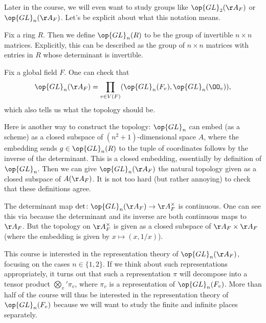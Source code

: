 \documentclass[../notes.tex]{subfiles}
\begin{document}
Later in the course, we will even want to study groups like $\op{GL}_2(\AA_F)$ or $\op{GL}_n(\AA_F)$. Let's be explicit about what this notation means.
\begin{definition}
	Fix a ring $R$. Then we define $\op{GL}_n(R)$ to be the group of invertible $n\times n$ matrices. Explicitly, this can be described as the group of $n\times n$ matrices with entries in $R$ whose determinant is invertible.
\end{definition}
\begin{remark}
	Fix a global field $F$. One can check that
	\[\op{GL}_n(\AA_F)=\prod_{v\in V(F)}(\op{GL}_n(F_v),\op{GL}_n(\OO_v)),\]
	which also tells us what the topology should be.
\end{remark}
\begin{remark} \label{rem:embed-to-get-topology}
	Here is another way to construct the topology: $\op{GL}_n$ can embed (as a scheme) as a closed subspace of $\left(n^2+1\right)$-dimensional space $A$, where the embedding sends $g\in\op{GL}_n(R)$ to the tuple of coordinates follows by the inverse of the determinant. This is a closed embedding, essentially by definition of $\op{GL}_n$. Then we can give $\op{GL}_n(\AA_F)$ the natural topology given as a closed subspace of $A(\AA_F)$. It is not too hard (but rather annoying) to check that these definitions agree.
\end{remark}
\begin{example}
	The determinant map $\det\colon\op{GL}_n(\AA_F)\to\AA_F^\times$ is continuous. One can see this via  because the determinant and its inverse are both continuous maps to $\AA_F$. But the topology on $\AA_F^\times$ is given as a closed subspace of $\AA_F\times\AA_F$ (where the embedding is given by $x\mapsto(x,1/x)$).
\end{example}
This course is interested in the representation theory of $\op{GL}_n(\AA_F)$, focusing on the cases $n\in\{1,2\}$. If we think about such representations appropriately, it turns out that such a representation $\pi$ will decompose into a tensor product $\bigotimes_v'\pi_v$, where $\pi_v$ is a representation of $\op{GL}_n(F_v)$. More than half of the course will thus be interested in the representation theory of $\op{GL}_n(F_v)$ because we will want to study the finite and infinite places separately.
\end{document}
